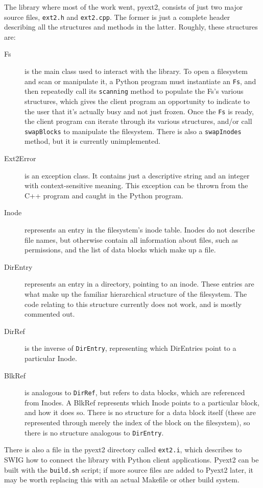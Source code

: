 \documentclass[10pt]{article}
\begin{document}
The library where most of the work went, pyext2, consists of just two major source files, \texttt{ext2.h} and \texttt{ext2.cpp}. The former is just a complete header describing all the structures and methods in the latter. Roughly, these structures are:
\begin{description}
 \item[Fs] is the main class used to interact with the library. To open a filesystem and scan or manipulate it, a Python program must instantiate an \texttt{Fs}, and then repeatedly call its \texttt{scanning} method to populate the Fs's various structures, which gives the client program an opportunity to indicate to the user that it's actually busy and not just frozen. Once the \texttt{Fs} is ready, the client program can iterate through its various structures, and/or call \texttt{swapBlocks} to manipulate the filesystem. There is also a \texttt{swapInodes} method, but it is currently unimplemented.
 \item[Ext2Error] is an exception class. It contains just a descriptive string and an integer with context-sensitive meaning. This exception can be thrown from the C++ program and caught in the Python program.
 \item[Inode] represents an entry in the filesystem's inode table. Inodes do not describe file names, but otherwise contain all information about files, such as permissions, and the list of data blocks which make up a file.
 \item[DirEntry] represents an entry in a directory, pointing to an inode. These entries are what make up the familiar hierarchical structure of the filesystem. The code relating to this structure currently does not work, and is mostly commented out.
 \item[DirRef] is the inverse of \texttt{DirEntry}, representing which DirEntries point to a particular Inode.
 \item[BlkRef] is analogous to \texttt{DirRef}, but refers to data blocks, which are referenced from Inodes. A BlkRef represents which Inode points to a particular block, and how it does so. There is no structure for a data block itself (these are represented through merely the index of the block on the filesystem), so there is no structure analogous to \texttt{DirEntry}.
\end{description}

There is also a file in the pyext2 directory called \texttt{ext2.i}, which describes to SWIG how to connect the library with Python client applications. Pyext2 can be built with the \texttt{build.sh} script; if more source files are added to Pyext2 later, it may be worth replacing this with an actual Makefile or other build system.
\end{document}
